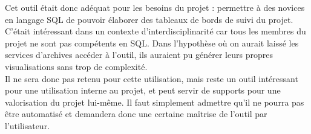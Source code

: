 Cet outil était donc adéquat pour les besoins du projet : permettre à des novices en langage \gls{SQL} de pouvoir élaborer des tableaux de bords de suivi du projet. C’était intéressant dans un contexte d’interdisciplinarité car tous les membres du projet ne sont pas compétents en SQL. Dans l’hypothèse où on aurait laissé les services d’archives accéder à l’outil, ils auraient pu générer leurs propres visualisations sans trop de complexité. \\
Il ne sera donc pas retenu pour cette utilisation, mais reste un outil intéressant pour une utilisation interne au projet, et peut servir de supports pour une valorisation du projet lui-même. Il faut simplement admettre qu’il ne pourra pas être automatisé et demandera donc une certaine maîtrise de l’outil par l’utilisateur. 




